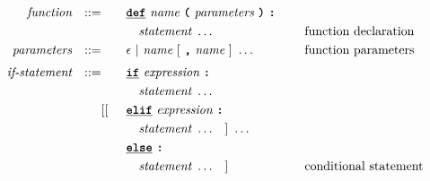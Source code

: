\begin{alignat*}{9}
&& \textit{function} && ::=&\quad && \textbf{\texttt{\underline{def}}}\  \textit{name} \ 
                                   \textbf{\texttt{(}}\  \textit{parameters} \ \textbf{\texttt{)}} \
                                   \textbf{\texttt{:}} \ \quad
                                                           && \\         
&&                       &&     &\quad && \quad \textit{statement} \ \ldots \quad
                                                           && \textrm{function declaration}\\                                                           
&& \textit{parameters}   && ::= &\quad &&  \epsilon\ | \  \textit{name} \ 
                                                   [\ \textbf{\texttt{,}} \ \textit{name}\ ]\ \ldots
                                                            && \textrm{function parameters}   \\[1mm]
&& \textit{if-statement} && ::= &\quad &&  \textbf{\texttt{\underline{if}}}\ \textit{expression} \ 
                                           \textbf{\texttt{:}}  \\
&&                       &&     &\quad && \quad \textit{statement} \ \ldots \quad
                                                           &&  \\  
&&                       &&     &      [[&& \textbf{\texttt{\underline{elif}}} \ \textit{expression} \
                                          \textbf{\texttt{:}} \\ 
&&                       &&     &\quad && \quad \textit{statement} \ \ldots \quad ] \ \ldots \quad 
                                                           &&  \\     
&&                       &&     &      && \textbf{\texttt{\underline{else}}}\
                                          \textbf{\texttt{:}} \\
&&                       &&     &\quad && \quad \textit{statement} \ \ldots \quad ]
                                                           && \textrm{conditional statement}  \\[1mm]

\end{alignat*}
